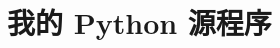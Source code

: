 \documentclass[bwprint]{gmcmthesis}
\begin{document}




\newpage
\appendix
\section{我的 Python 源程序}
\begin{lstlisting}[language=Python]%设置不同语言即可。



 \end{lstlisting}
\end{document}
